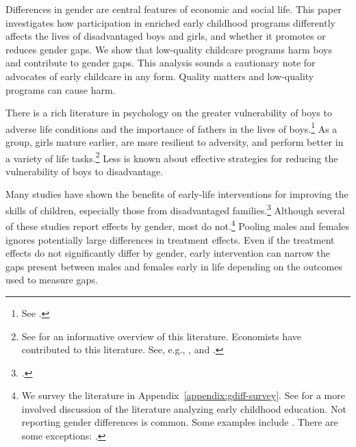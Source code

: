 Differences in gender are central features of economic and social life. This paper investigates how participation in enriched early childhood programs differently affects the lives of disadvantaged boys and girls, and whether it promotes or reduces gender gaps. We show that low-quality childcare programs harm boys and contribute to gender gaps. This analysis sounds a cautionary note for advocates of early childcare in any form. Quality matters and low-quality programs can cause harm.

There is a rich literature in psychology on the greater vulnerability of boys to adverse life conditions and the importance of fathers in the lives of boys.\footnote{See \citet{golding2016psychology}.} As a group, girls mature earlier, are more resilient to adversity, and perform better in a variety of life tasks.\footnote{See \citet{Schore_2017_IMHJ} for an informative overview of this literature. Economists have contributed to this literature. See, e.g., \citet{Bertrand_Pan_2013_AEJAE}, \citet{Autor-etal_2015_Family-Disadvantage} and \citet{Kottelenberg-Lehrer_2014_Gender-Effects}.} Less is known about effective strategies for reducing the vulnerability of boys to disadvantage.

Many studies have shown the benefits of early-life interventions for improving the skills of children, especially those from disadvantaged families.\footnote{\citet{Currie_2011_AER,Elango_Hojman_etal_2016_Early-Edu}.} Although several of these studies report effects by gender, most do not.\footnote{We survey the literature in Appendix~\ref{appendix:gdiff-survey}. See \citet{Elango_Hojman_etal_2016_Early-Edu} for a more involved discussion of the literature analyzing early childhood education. Not reporting gender differences is common. Some examples include \citet{Bernal_Keane_2011_JoLE,Cascio_Schanzenbach_2013_ImpactsExpandingAccess,Bitler_et_al_2014_Head_Start_Unpublished,Kline_Walters_2016_QJE}. There are some exceptions: \citet{Heckman_Moon_etal_2010_QE,Campbell_Conti_etal_2014_EarlyChildhoodInvestments,Garcia_Heckman_Leaf_etal_2017_Comp_CBA_Unpublished}.} Pooling males and females ignores potentially large differences in treatment effects. Even if the treatment effects do not significantly differ by gender, early intervention can narrow the gaps present between males and females early in life depending on the outcomes used to measure gaps.

